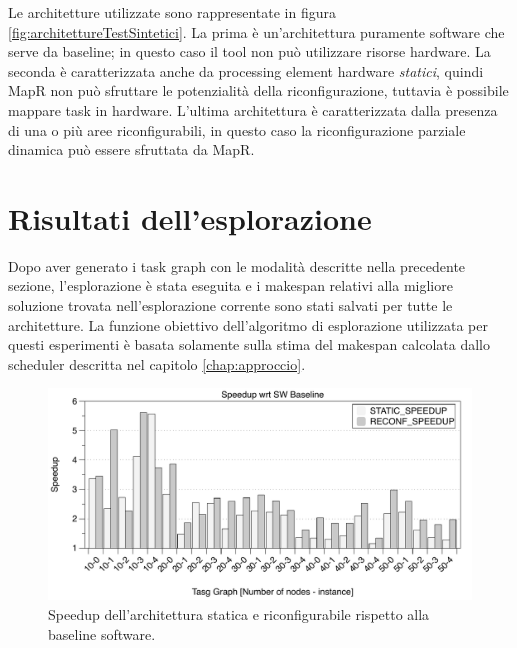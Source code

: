 Le architetture utilizzate
sono rappresentate in figura \ref{fig:architettureTestSintetici}. La prima \`e un'architettura puramente
software che serve da baseline; in questo caso il tool non pu\`o utilizzare risorse hardware.
La seconda \`e caratterizzata anche da processing element hardware \emph{statici}, quindi MapR non pu\`o
sfruttare le potenzialit\`a della riconfigurazione, tuttavia \`e possibile mappare task in hardware.
L'ultima architettura \`e caratterizzata dalla presenza di una o pi\`u aree riconfigurabili, in questo
caso la riconfigurazione parziale dinamica pu\`o essere sfruttata da MapR.


\section{Risultati dell'esplorazione}
\label{sec:risultatiEsplorazione}
Dopo aver generato i task graph con le modalit\`a descritte nella precedente
sezione, l'esplorazione \`e stata eseguita e i makespan relativi alla migliore soluzione
trovata nell'esplorazione corrente sono stati salvati per tutte le architetture.
La funzione obiettivo dell'algoritmo di esplorazione utilizzata per questi esperimenti
\`e basata solamente sulla stima del makespan calcolata dallo scheduler descritta nel
capitolo \ref{chap:approccio}.

\begin{figure}[t]
 \begin{center}
  \includegraphics[width=\textwidth]{./capitoli/figure/cap6/FPL_makespan.pdf}
  \caption{Speedup dell'architettura statica e riconfigurabile rispetto alla
  baseline software.}
  \label{fig:speedupBaseline}
 \end{center}
\end{figure}

